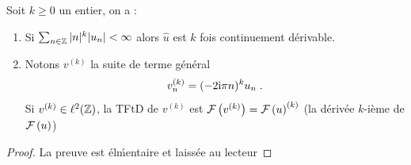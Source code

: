 \begin{theorem}
Soit $k\geq 0$ un entier, on a :
\begin{enumerate}[label=(\roman*)]
\item Si $\sum_{n\in \mathbb{Z}}|n|^{k}|u_{n}|<\infty$ alors $\hat{u}$ est $k$ fois continuement d\'{e}rivable.
\item Notons $v^{(k)}$ la suite de terme g\'{e}n\'{e}ral
$$
v_{n}^{(k)}=(-2 \mathrm{i}\pi n)^{k}u_{n} \;.
$$
Si $v^{(k)} \in \ell^2(\mathbb{Z})$, la TFtD de $v^{(k)}$ est $\mathcal{F}\left( v^{(k)} \right)=\mathcal{F}\left( u \right)^{(k)}$ (la d\'{e}riv\'{e}e $k$-i\`{e}me de $\mathcal{F}\left( u \right)$)
\end{enumerate}
\end{theorem}
\begin{proof}
La preuve est \'el\'mentaire et laiss\'ee au lecteur
\end{proof}



